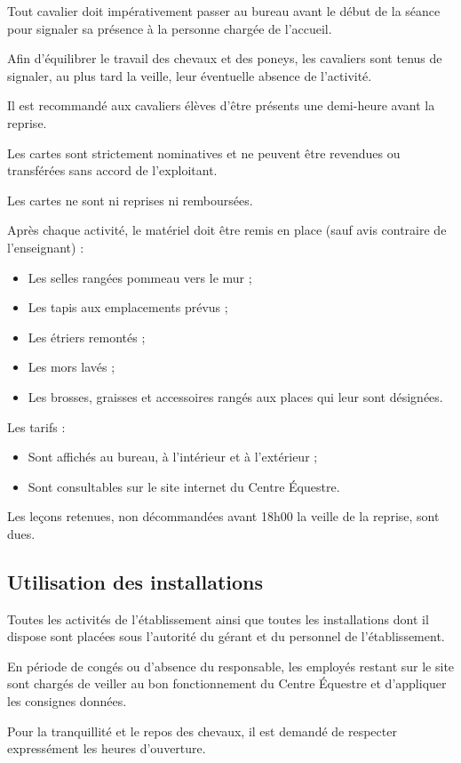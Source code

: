 \documentclass[11pt,a4paper]{article}
\begin{document}
Tout cavalier doit impérativement passer au bureau avant le début de la séance pour signaler sa présence à la personne chargée de l'accueil.

Afin d'équilibrer le travail des chevaux et des poneys, les cavaliers sont tenus de signaler, au plus tard la veille, leur éventuelle absence de l'activité.

Il est recommandé aux cavaliers élèves d'être présents une demi-heure avant la reprise.

Les cartes sont strictement nominatives et ne peuvent être revendues ou transférées sans accord de l'exploitant. \par
Les cartes ne sont ni reprises ni remboursées.

Après chaque activité, le matériel doit être remis en place (sauf avis contraire de l'enseignant) :
\begin{itemize}[leftmargin=50pt]
	\item
	Les selles rangées pommeau vers le mur ;
	\item
	Les tapis aux emplacements prévus ;
	\item
	Les étriers remontés ;
	\item
	Les mors lavés ;
	\item
	Les brosses, graisses et accessoires rangés aux places qui leur sont désignées.
\end{itemize}

Les tarifs :
\begin{itemize}[leftmargin=50pt]
\item
Sont affichés au bureau, à l'intérieur et à l'extérieur ;
\item
Sont consultables sur le site internet du Centre Équestre.
\end{itemize}

Les leçons retenues, non décommandées avant 18h00 la veille de la reprise, sont dues.

\subsection{Utilisation des installations}
Toutes les activités de l'établissement ainsi que toutes les installations dont il dispose sont placées sous l'autorité du gérant et du personnel de l'établissement. \par
En période de congés ou d'absence du responsable, les employés restant sur le site sont chargés de veiller au bon fonctionnement du Centre Équestre et d'appliquer les consignes données. \par
Pour la tranquillité et le repos des chevaux, il est demandé de respecter expressément les heures d'ouverture.
\end{document}
